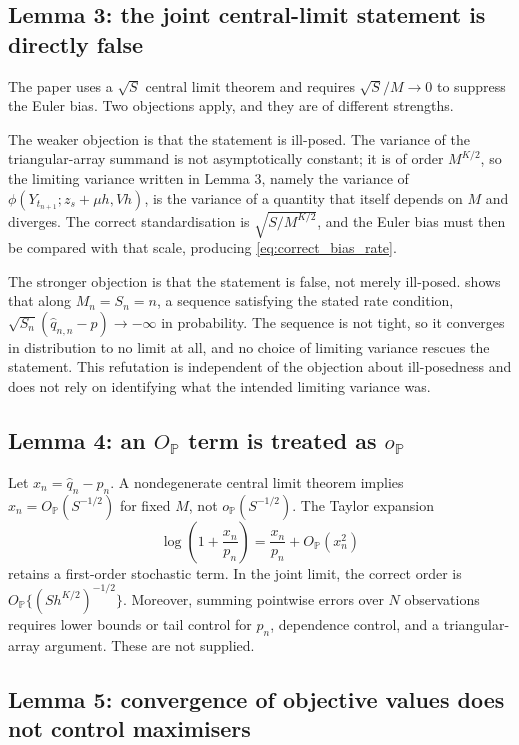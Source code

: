 \documentclass[11pt]{article}
\theoremstyle{definition}
\newcommand{\Pp}{\mathbb{P}}
\begin{document}
\subsection{Lemma 3: the joint central-limit statement is directly false}

The paper uses a $\sqrt S$ central limit theorem and requires $\sqrt S/M\to0$ to suppress the Euler bias. Two objections apply, and they are of different strengths.

The weaker objection is that the statement is ill-posed. The variance of the triangular-array summand is not asymptotically constant; it is of order $M^{K/2}$, so the limiting variance written in Lemma 3, namely the variance of $\phi(Y_{t_{n+1}};z_s+\mu h,Vh)$, is the variance of a quantity that itself depends on $M$ and diverges. The correct standardisation is $\sqrt{S/M^{K/2}}$, and the Euler bias must then be compared with that scale, producing \eqref{eq:correct_bias_rate}.

The stronger objection is that the statement is false, not merely ill-posed.  shows that along $M_n=S_n=n$, a sequence satisfying the stated rate condition, $\sqrt{S_n}(\widehat q_{n,n}-p)\to-\infty$ in probability. The sequence is not tight, so it converges in distribution to no limit at all, and no choice of limiting variance rescues the statement. This refutation is independent of the objection about ill-posedness and does not rely on identifying what the intended limiting variance was.

\subsection{Lemma 4: an \texorpdfstring{$O_{\Pp}$}{O\_P} term is treated as \texorpdfstring{$o_{\Pp}$}{o\_P}}

Let $x_n=\widehat q_n-p_n$. A nondegenerate central limit theorem implies $x_n=O_{\Pp}(S^{-1/2})$ for fixed $M$, not $o_{\Pp}(S^{-1/2})$. The Taylor expansion
\[
\log\left(1+\frac{x_n}{p_n}\right)
=\frac{x_n}{p_n}+O_{\Pp}(x_n^2)
\]
retains a first-order stochastic term. In the joint limit, the correct order is $O_{\Pp}\{(S h^{K/2})^{-1/2}\}$. Moreover, summing pointwise errors over $N$ observations requires lower bounds or tail control for $p_n$, dependence control, and a triangular-array argument. These are not supplied.

\subsection{Lemma 5: convergence of objective values does not control maximisers}
\end{document}
